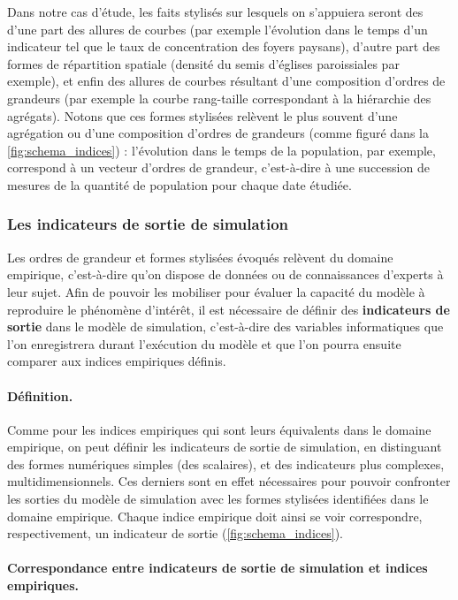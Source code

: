 Dans notre cas d'étude, les faits stylisés sur lesquels on s'appuiera seront des d'une part des \og allures\fg{} de courbes (par exemple l'évolution dans le temps d'un indicateur tel que le taux de concentration des foyers paysans), d'autre part des formes de répartition spatiale (densité du semis d'églises paroissiales par exemple), et enfin des \og allures\fg{} de courbes résultant d'une composition d'ordres de grandeurs (par exemple la courbe rang-taille correspondant à la hiérarchie des agrégats).
Notons que ces formes stylisées relèvent le plus souvent d'une agrégation ou d'une composition d'ordres de grandeurs (comme figuré dans la \cref{fig:schema_indices}) :
l'évolution dans le temps de la population, par exemple, correspond à un vecteur d'ordres de grandeur, c'est-à-dire à une succession de mesures de la quantité de population pour chaque date étudiée.

\subsubsection{Les indicateurs de sortie de simulation}

Les ordres de grandeur et formes stylisées évoqués relèvent du domaine empirique, c'est-à-dire qu'on dispose de données ou de connaissances d'experts à leur sujet.
Afin de pouvoir les mobiliser pour évaluer la capacité du modèle à reproduire le phénomène d'intérêt, il est nécessaire de définir des \textbf{indicateurs de sortie} dans le modèle de simulation, c'est-à-dire des variables informatiques que l'on enregistrera durant l'exécution du modèle et que l'on pourra ensuite comparer aux indices empiriques définis.

\paragraph{Définition.}
Comme pour les indices empiriques qui sont leurs équivalents dans le domaine empirique, on peut définir les indicateurs de sortie de simulation, en distinguant des formes numériques simples (des scalaires), et des indicateurs plus complexes, multidimensionnels.
Ces derniers sont en effet nécessaires pour pouvoir confronter les sorties du modèle de simulation avec les formes stylisées identifiées dans le domaine empirique.
Chaque indice empirique doit ainsi se voir correspondre, respectivement, un indicateur de sortie (\cref{fig:schema_indices}).

\paragraph{Correspondance entre indicateurs de sortie de simulation et indices empiriques.}\label{par:correspondance}

